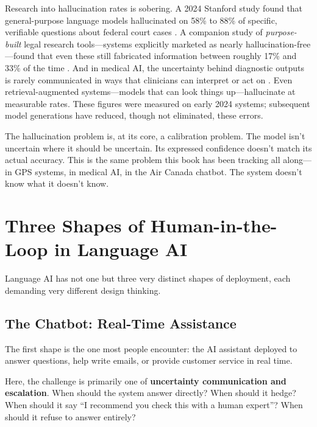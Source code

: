 Research into hallucination rates is sobering. A 2024 Stanford study found that general-purpose language models hallucinated on 58\% to 88\% of specific, verifiable questions about federal court cases \autocite{dahl2024large}. A companion study of \emph{purpose-built} legal research tools---systems explicitly marketed as nearly hallucination-free---found that even these still fabricated information between roughly 17\% and 33\% of the time \autocite{magesh2024hallucination}. And in medical AI, the uncertainty behind diagnostic outputs is rarely communicated in ways that clinicians can interpret or act on \autocite{kompa2021second}. Even retrieval-augmented systems---models that can look things up---hallucinate at measurable rates. These figures were measured on early 2024 systems; subsequent model generations have reduced, though not eliminated, these errors.

\begin{keyconcept}
The hallucination problem is, at its core, a calibration problem. The model isn't uncertain where it should be uncertain. Its expressed confidence doesn't match its actual accuracy. This is the same problem this book has been tracking all along---in GPS systems, in medical AI, in the Air Canada chatbot. The system doesn't know what it doesn't know.
\end{keyconcept}

\section{Three Shapes of Human-in-the-Loop in Language AI}
\label{sec:three-hitl-shapes}

Language AI has not one but three very distinct shapes of \hitl deployment, each demanding very different design thinking.

\subsection{The Chatbot: Real-Time Assistance}

The first shape is the one most people encounter: the AI assistant deployed to answer questions, help write emails, or provide customer service in real time.

Here, the \hitl challenge is primarily one of \textbf{uncertainty communication and escalation}. When should the system answer directly? When should it hedge? When should it say ``I recommend you check this with a human expert''? When should it refuse to answer entirely?

